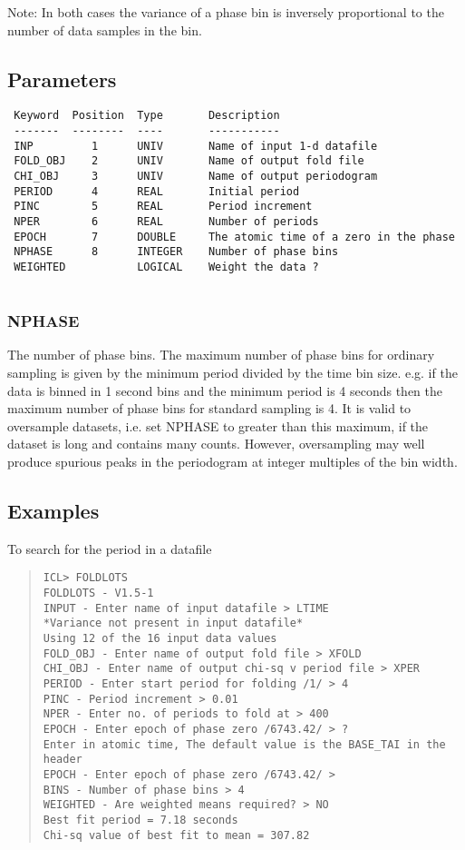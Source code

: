 \documentclass{book}
\renewcommand{\_}{{\tt\char'137}}     %
\begin{document}
Note: In both cases the variance of a phase bin is inversely
proportional to the number of data samples in the bin.
 
\subsection{Parameters}
\begin{verbatim}
 Keyword  Position  Type       Description
 -------  --------  ----       -----------
 INP         1      UNIV       Name of input 1-d datafile
 FOLD_OBJ    2      UNIV       Name of output fold file
 CHI_OBJ     3      UNIV       Name of output periodogram
 PERIOD      4      REAL       Initial period
 PINC        5      REAL       Period increment
 NPER        6      REAL       Number of periods
 EPOCH       7      DOUBLE     The atomic time of a zero in the phase
 NPHASE      8      INTEGER    Number of phase bins
 WEIGHTED           LOGICAL    Weight the data ?
 
\end{verbatim}\subsubsection{NPHASE}
The number of phase bins. The maximum number of phase bins for
ordinary sampling is given by the minimum period divided by the
time bin size. e.g. if the data is binned in 1 second bins and
the minimum period is 4 seconds then the maximum number of phase
bins for standard sampling is 4. It is valid to oversample datasets,
i.e. set NPHASE to greater than this maximum, if the dataset is long
and contains many counts. However, oversampling may well produce spurious
peaks in the periodogram at integer multiples of the bin width.
 
\subsection{Examples}
To search for the period in a datafile
\begin{quote}\begin{verbatim}
ICL> FOLDLOTS
FOLDLOTS - V1.5-1
INPUT - Enter name of input datafile > LTIME
*Variance not present in input datafile*
Using 12 of the 16 input data values
FOLD_OBJ - Enter name of output fold file > XFOLD
CHI_OBJ - Enter name of output chi-sq v period file > XPER
PERIOD - Enter start period for folding /1/ > 4
PINC - Period increment > 0.01
NPER - Enter no. of periods to fold at > 400
EPOCH - Enter epoch of phase zero /6743.42/ > ?
Enter in atomic time, The default value is the BASE_TAI in the header
EPOCH - Enter epoch of phase zero /6743.42/ >
BINS - Number of phase bins > 4
WEIGHTED - Are weighted means required? > NO
Best fit period = 7.18 seconds
Chi-sq value of best fit to mean = 307.82
\end{verbatim}\end{quote}
\end{document}
